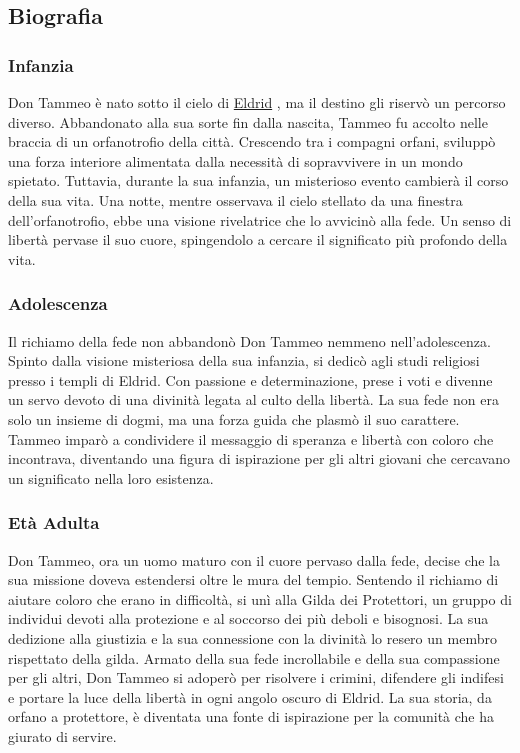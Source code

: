 \subsection{Biografia}\label{biografia}


\subsubsection{Infanzia}

Don Tammeo è nato sotto il cielo di
\href{Eldrid\%20bd820bb9f6164b39ae6e611a94748518.md}{Eldrid} , ma il
destino gli riservò un percorso diverso. Abbandonato alla sua sorte fin
dalla nascita, Tammeo fu accolto nelle braccia di un orfanotrofio della
città. Crescendo tra i compagni orfani, sviluppò una forza interiore
alimentata dalla necessità di sopravvivere in un mondo spietato.
Tuttavia, durante la sua infanzia, un misterioso evento cambierà il
corso della sua vita. Una notte, mentre osservava il cielo stellato da
una finestra dell'orfanotrofio, ebbe una visione rivelatrice che lo
avvicinò alla fede. Un senso di libertà pervase il suo cuore,
spingendolo a cercare il significato più profondo della vita.

\subsubsection{Adolescenza}

Il richiamo della fede non abbandonò Don Tammeo nemmeno
nell'adolescenza. Spinto dalla visione misteriosa della sua infanzia, si
dedicò agli studi religiosi presso i templi di Eldrid. Con passione e
determinazione, prese i voti e divenne un servo devoto di una divinità
legata al culto della libertà. La sua fede non era solo un insieme di
dogmi, ma una forza guida che plasmò il suo carattere. Tammeo imparò a
condividere il messaggio di speranza e libertà con coloro che
incontrava, diventando una figura di ispirazione per gli altri giovani
che cercavano un significato nella loro esistenza.

\subsubsection{Età Adulta}

Don Tammeo, ora un uomo maturo con il cuore pervaso dalla fede, decise
che la sua missione doveva estendersi oltre le mura del tempio. Sentendo
il richiamo di aiutare coloro che erano in difficoltà, si unì alla Gilda
dei Protettori, un gruppo di individui devoti alla protezione e al
soccorso dei più deboli e bisognosi. La sua dedizione alla giustizia e
la sua connessione con la divinità lo resero un membro rispettato della
gilda. Armato della sua fede incrollabile e della sua compassione per
gli altri, Don Tammeo si adoperò per risolvere i crimini, difendere gli
indifesi e portare la luce della libertà in ogni angolo oscuro di
Eldrid. La sua storia, da orfano a protettore, è diventata una fonte di
ispirazione per la comunità che ha giurato di servire.

